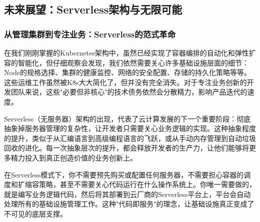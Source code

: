 


\subsection{未来展望：Serverless架构与无限可能}

\subsubsection{从管理集群到专注业务：Serverless的范式革命}

在我们刚刚掌握的Kubernetes架构中，虽然已经实现了容器编排的自动化和弹性扩容的智能化，但仔细观察会发现，我们依然需要关心许多基础设施层面的细节：Node的规格选择、集群的健康监控、网络的安全配置、存储的持久化策略等等。这些运维工作虽然被K8s大大简化了，但并没有完全消失。对于专注业务创新的开发团队来说，这些"必要但非核心"的技术债务依然会分散精力，影响产品迭代的速度。

Serverless（无服务器）架构的出现，代表了云计算发展的下一个重要阶段：彻底抽象掉服务器管理的复杂性，让开发者只需要关心业务逻辑的实现。这种抽象程度的提升，类似于从汇编语言到高级编程语言的飞跃，或从手动内存管理到自动垃圾回收的进化。每一次抽象层次的提升，都会释放开发者的生产力，让他们能够将更多精力投入到真正创造价值的业务创新上。

在Serverless模式下，你不需要预先购买或配置任何服务器，不需要担心容器的调度和扩缩容策略，甚至不需要关心代码运行在什么操作系统上。你唯一需要做的，就是编写业务逻辑代码，然后将其部署到云厂商的Serverless平台上，平台会自动处理所有的基础设施管理工作。这种"代码即服务"的理念，让基础设施真正变成了不可见的底层支撑。

